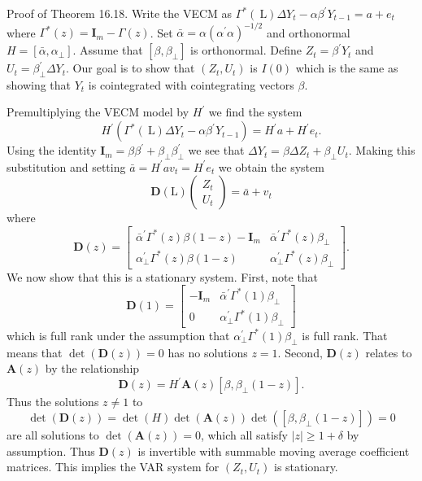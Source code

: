 \documentclass[10pt]{article}
\begin{document}
Proof of Theorem 16.18. Write the VECM as $\Gamma^{*}(\mathrm{~L}) \Delta Y_{t}-\alpha \beta^{\prime} Y_{t-1}=a+e_{t}$ where $\Gamma^{*}(z)=\boldsymbol{I}_{m}-\Gamma(z)$. Set $\bar{\alpha}=\alpha\left(\alpha^{\prime} \alpha\right)^{-1 / 2}$ and orthonormal $H=\left[\bar{\alpha}, \alpha_{\perp}\right]$. Assume that $\left[\beta, \beta_{\perp}\right]$ is orthonormal. Define $Z_{t}=\beta^{\prime} Y_{t}$ and $U_{t}=\beta_{\perp}^{\prime} \Delta Y_{t}$. Our goal is to show that $\left(Z_{t}, U_{t}\right)$ is $I(0)$ which is the same as showing that $Y_{t}$ is cointegrated with cointegrating vectors $\beta$.

Premultiplying the VECM model by $H^{\prime}$ we find the system
$$
H^{\prime}\left(\Gamma^{*}(\mathrm{~L}) \Delta Y_{t}-\alpha \beta^{\prime} Y_{t-1}\right)=H^{\prime} a+H^{\prime} e_{t} .
$$
Using the identity $\boldsymbol{I}_{m}=\beta \beta^{\prime}+\beta_{\perp} \beta_{\perp}^{\prime}$ we see that $\Delta Y_{t}=\beta \Delta Z_{t}+\beta_{\perp} U_{t}$. Making this substitution and setting $\bar{a}=H^{\prime} a v_{t}=H^{\prime} e_{t}$ we obtain the system
$$
\boldsymbol{D}(\mathrm{L})\left(\begin{array}{c}
Z_{t} \\
U_{t}
\end{array}\right)=\bar{a}+v_{t}
$$
where
$$
\boldsymbol{D}(z)=\left[\begin{array}{cc}
\bar{\alpha}^{\prime} \Gamma^{*}(z) \beta(1-z)-\boldsymbol{I}_{m} & \bar{\alpha}^{\prime} \Gamma^{*}(z) \beta_{\perp} \\
\alpha_{\perp}^{\prime} \Gamma^{*}(z) \beta(1-z) & \alpha_{\perp}^{\prime} \Gamma^{*}(z) \beta_{\perp}
\end{array}\right] .
$$
We now show that this is a stationary system. First, note that
$$
\boldsymbol{D}(1)=\left[\begin{array}{cc}
-\boldsymbol{I}_{m} & \bar{\alpha}^{\prime} \Gamma^{*}(1) \beta_{\perp} \\
0 & \alpha_{\perp}^{\prime} \Gamma^{*}(1) \beta_{\perp}
\end{array}\right]
$$
which is full rank under the assumption that $\alpha_{\perp}^{\prime} \Gamma^{*}(1) \beta_{\perp}$ is full rank. That means that $\operatorname{det}(\boldsymbol{D}(z))=0$ has no solutions $z=1$. Second, $\boldsymbol{D}(z)$ relates to $\boldsymbol{A}(z)$ by the relationship
$$
\boldsymbol{D}(z)=H^{\prime} \boldsymbol{A}(z)\left[\beta, \beta_{\perp}(1-z)\right] .
$$
Thus the solutions $z \neq 1$ to
$$
\operatorname{det}(\boldsymbol{D}(z))=\operatorname{det}(H) \operatorname{det}(\boldsymbol{A}(z)) \operatorname{det}\left(\left[\beta, \beta_{\perp}(1-z)\right]\right)=0
$$
are all solutions to $\operatorname{det}(\boldsymbol{A}(z))=0$, which all satisfy $|z| \geq 1+\delta$ by assumption. Thus $\boldsymbol{D}(z)$ is invertible with summable moving average coefficient matrices. This implies the VAR system for $\left(Z_{t}, U_{t}\right)$ is stationary.
\end{document}
